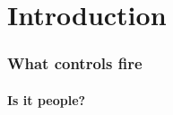 \section{Introduction}

\begin{frame}
    \frametitle{What controls fire}
    \framesubtitle{Is it people?}
\end{frame}
